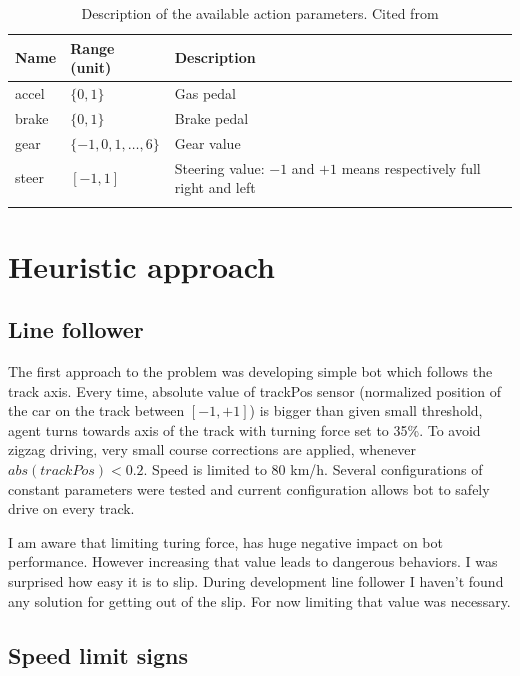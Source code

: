 \documentclass[declaration,shortabstract,english,inz]{iithesis}
\begin{document}
\begin{center}
    \begin{longtable}{ | p{} |p{}| p{} |}
    \hline
    \textbf{Name} & \textbf{Range (unit)} & \textbf{Description}  \\ 
    \hline
    accel & $\{0,1\}$ & Gas pedal \\ 
     \hline
     brake &  $\{0,1\}$ & Brake pedal \\ 
     \hline
     gear & $\{-1,0,1,\dots ,6\}$ & Gear value \\ 
     \hline
     steer &  $[-1,1]$ & Steering value: $-1$ and $+1$ means respectively full right and
     left \\ 
     \hline
     \caption{\label{tab:torcs_actions}Description of the available  action parameters. Cited from \cite{scrc_manual}}
    \end{longtable}
\end{center}

\chapter{Heuristic approach}

\section{Line follower}

The first approach to the problem was developing simple bot which follows the track axis. Every time, absolute value of trackPos sensor (normalized position of the car on the track between $[-1, +1]$) is bigger than given small threshold, agent turns towards axis of the track with turning force set to 35\%. To avoid zigzag driving, very small course corrections are applied, whenever $abs(trackPos) < 0.2$. Speed is limited to 80 km/h. Several configurations of constant parameters were tested and current configuration allows bot to safely drive on every track. 

I am aware that limiting turing force, has huge negative impact on bot performance. However increasing that value leads to dangerous behaviors. I was surprised how easy it is to slip. During development line follower I haven't found any solution for getting out of the slip. For now limiting that value was necessary.

\section{Speed limit signs}
\end{document}
